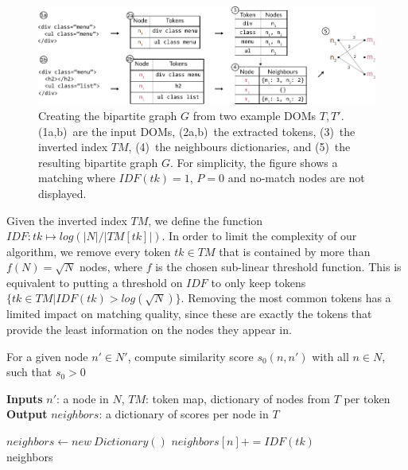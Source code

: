 \begin{figure}
    \centering
    \includegraphics[width=\linewidth]{tree-matching/explanation/inverted_index}
    \caption{Creating the bipartite graph $G$ from two example DOMs $T,T'$. (1a,b)~are the input DOMs, (2a,b)~the extracted tokens, (3)~the inverted index $TM$, (4)~the neighbours dictionaries, and (5)~the resulting bipartite graph $G$. For simplicity, the figure shows a matching where $IDF(tk)=1$, $P=0$ and no-match nodes are not displayed.}\label{sftm:fig:inverted_index}
\end{figure}

Given the inverted index $TM$, we define the function $IDF: tk \mapsto log(|N|/|TM[tk]|)$.
In order to limit the complexity of our algorithm, we remove every token $tk \in TM$ that is contained by more than $f(N)=\sqrt{N}$ nodes, where $f$ is the chosen sub-linear threshold function.
This is equivalent to putting a threshold on $IDF$ to only keep tokens $\{tk \in TM |IDF(tk) > log(\sqrt{N})\}$.
Removing the most common tokens has a limited impact on matching quality, since these are exactly the tokens that provide the least information on the nodes they appear in.

\begin{algorithm}
\caption{For a given node $n'\in N'$, compute similarity score $s_0(n,n')$ with all $n\in N$, such that $s_0 > 0$}
\hspace*{\algorithmicindent} \textbf{Inputs}
$n'$: a node in $N$, 
$TM$: token map, dictionary of nodes from $T$ per token \\
\hspace*{\algorithmicindent} \textbf{Output} 
$neighbors$: a dictionary of scores per node in $T$
\begin{algorithmic}
\State $neighbors \gets new\ Dictionary()$
        \State $neighbors[n] += IDF(tk)$
    \EndFor
\EndFor \\
\Return neighbors
\end{algorithmic}
\label{scoreAlgo}
\end{algorithm}

